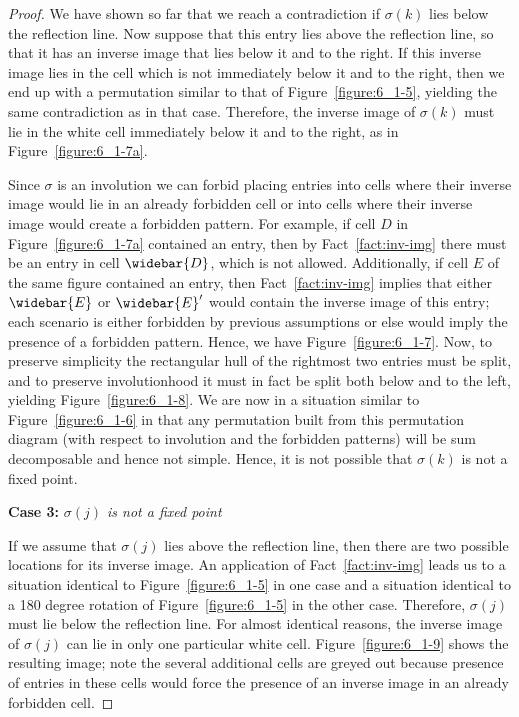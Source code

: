 \documentclass[10pt]{article}
\theoremstyle{plain}
\begin{document}
\begin{proof}
	
	We have shown so far that we reach a contradiction if $\sigma(k)$ lies below the reflection line. Now suppose that this entry lies above the reflection line, so that it has an inverse image that lies below it and to the right. If this inverse image lies in the cell which is not immediately below it and to the right, then we end up with a permutation similar to that of Figure~\ref{figure:6_1-5}, yielding the same contradiction as in that case. Therefore, the inverse image of $\sigma(k)$ must lie in the white cell immediately below it and to the right, as in Figure~\ref{figure:6_1-7a}.
	
	Since $\sigma$ is an involution we can forbid placing entries into cells where their inverse image would lie in an already forbidden cell or into cells where their inverse image would create a forbidden pattern. For example, if cell $D$ in Figure~\ref{figure:6_1-7a} contained an entry, then by Fact~\ref{fact:inv-img} there must be an entry in cell $\widebar{D}$, which is not allowed. Additionally, if cell $E$ of the same figure contained an entry, then Fact~\ref{fact:inv-img} implies that either $\widebar{E}$ or $\widebar{E}'$ would contain the inverse image of this entry; each scenario is either forbidden by previous assumptions or else would imply the presence of a forbidden pattern. Hence, we have Figure~\ref{figure:6_1-7}. Now, to preserve simplicity the rectangular hull of the rightmost two entries must be split, and to preserve involutionhood it must in fact be split both below and to the left, yielding Figure~\ref{figure:6_1-8}. We are now in a situation similar to Figure~\ref{figure:6_1-6} in that any permutation built from this permutation diagram (with respect to involution and the forbidden patterns) will be sum decomposable and hence not simple. Hence, it is not possible that $\sigma(k)$ is not a fixed point.
	
	\bigskip
	
	\textbf{Case 3:} \emph{$\sigma(j)$ is not a fixed point}
	
	 If we assume that $\sigma(j)$ lies above the reflection line, then there are two possible locations for its inverse image. An application of Fact~\ref{fact:inv-img} leads us to a situation identical to Figure~\ref{figure:6_1-5} in one case and a situation identical to a 180 degree rotation of Figure~\ref{figure:6_1-5} in the other case. Therefore, $\sigma(j)$ must lie below the reflection line. For almost identical reasons, the inverse image of $\sigma(j)$ can lie in only one particular white cell. Figure~\ref{figure:6_1-9} shows the resulting image; note the several additional cells are greyed out because presence of entries in these cells would force the presence of an inverse image in an already forbidden cell.
	 

\end{proof}
\end{document}
